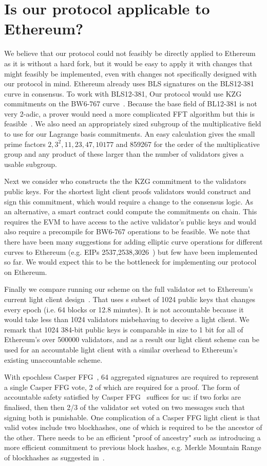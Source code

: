 \section{Is our protocol applicable to Ethereum?} 
\label{sec:ethereum}

We believe that our protocol could not feasibly be directly applied to Ethereum as it is without a hard fork, but it would be easy to apply it with changes that might 
feasibly be implemented, even with changes not specifically designed with our protocol in mind. Ethereum already uses BLS signatures on the BLS12-381 curve 
in consensus. To work with BLS12-381, Our protocol would use KZG commitments on the BW6-767 curve~\cite{bw6767}. Because the base field of BL12-381 is not 
very 2-adic, a prover would need a more complicated FFT algorithm but this is feasible~\cite{bw6767}. We also need an appropriately sized subgroup of the multiplicative 
field to use for our Lagrange basis commitments. An easy calculation gives the small prime factors $2,3^2,11,23,47,10177$ and 859267 for the order of the multiplicative 
group and any product of these larger than the number of validators gives a usable subgroup.
 
Next we consider who constructs the the KZG commitment to the validators public keys. For the shortest light client proofs validators would construct and sign this 
commitment, which would require a change to the consensus logic. As an alternative, a smart contract could compute the commitments on chain. This requires the 
EVM to have access to the active validator's public keys and would also require a precompile for BW6-767 operations to be feasible. We note that there have been 
many suggestions for adding elliptic curve operations for different curves to Ethereum (e.g. EIPs 2537,2538,3026~\cite{EIPs}) but few have been implemented so 
far. We would expect this to be the bottleneck for implementing our protocol on Ethereum.
 
Finally we compare running our scheme on the full validator set to Ethereum's current light client design~\cite{ethlight}. That uses s subset of 1024 public keys 
that changes every epoch (i.e. 64 blocks or 12.8 minutes). It is not accountable because it would take less than 1024 validators misbehaving to deceive a light client. 
We remark that 1024 384-bit public keys is comparable in size to 1 bit for all of Ethereum's over 500000 validators, and as a result our light client scheme can be 
used for an accountable light client with a similar overhead to Ethereum's existing unaccountable scheme.

With epochless Casper FFG~\cite{Gasper}, 64 aggregated signatures are required to represent a single Casper FFG vote, 2 of which are required for a proof. The form 
of accountable safety satisfied by Casper FFG~\cite{CasperFFG} suffices for us: if two forks are finalised, then then 2/3 of the validator set voted on two messages such 
that signing both is punishable. One complication of a Casper FFG light client is that valid votes include two blockhashes, one of which is required to be the ancestor 
of the other. There needs to be an efficient "proof of ancestry" such as introducing a more efficient commitment to previous block hashes, e.g. Merkle Mountain 
Range of blockhashes as suggested in~\cite{flyclient}.
